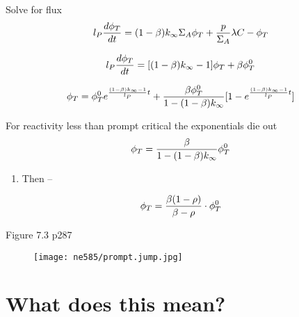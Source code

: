 \documentclass[aspectratio=1610,pdftex,dvipsnames,compress,xcolor={dvipsnames}]{beamer}
\begin{document}
\begin{frame}{Solve for flux}
    \begin{equation}
        \LARGE
        l_P \frac{d\phi_T}{dt} =(1-\beta) k_\infty \Sigma_A \phi_T + \frac{p}{\Sigma_A} \lambda C - \phi_T
    \end{equation}

    \begin{equation}
        \LARGE
        l_P \frac{d\phi_T}{dt} = [(1-\beta)k_\infty-1] \phi_T + \beta \phi_T^0
    \end{equation}

    \begin{equation}
        \LARGE
        \phi_T = \phi_T^0 e^{\frac{(1-\beta) k_\infty-1} {l_P}t} + \frac{\beta \phi_T^0}{1 - (1-\beta) k_\infty}[1 - e^{\frac{(1-\beta) k_\infty - 1} {l_P}t}]
    \end{equation}
\end{frame}


\begin{frame}{For reactivity less than prompt critical the exponentials die out}
    \begin{equation}
        \LARGE
        \phi_T = \frac{\beta}{1 - (1-\beta) k_\infty} \phi_T^0
    \end{equation}

    \vspace*{\fill}

    \begin{enumerate}[series=outerlist,topsep=0pt,itemsep=21pt,leftmargin=*,label=(\arabic*)]
        \item[]Then --
    \end{enumerate}

    \vspace*{\fill}

    \begin{equation}
        \LARGE
        \phi_T = \frac{\beta (1 - \rho)}{\beta - \rho} \cdot \phi_T^0
    \end{equation}
\end{frame}


\begin{frame}{Figure 7.3 p287}
    \begin{figure}
        \centering
        \texttt{[image: ne585/prompt.jump.jpg]}
    \end{figure}
\end{frame}


\section{What does this mean?}
\end{document}
